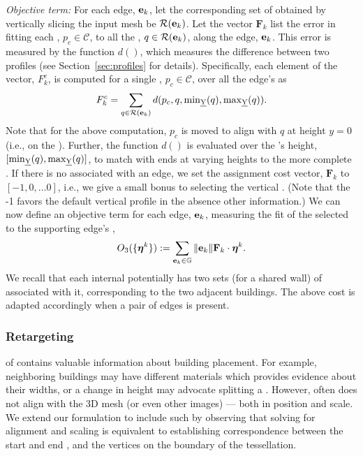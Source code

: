 {\noindent \em Objective term:}
For each edge, $\mathbf{e}_k$, let the corresponding set of \rawprofiles obtained by vertically slicing the input mesh be $\mathcal{R}(\mathbf{e}_k)$.
%
Let the vector $\mathbf{F}_k$ list the error in fitting each \cleanprofile, $p_c \in \mathcal{C}$, to all the \rawprofiles, $q \in \mathcal{R}(\mathbf{e}_k)$, along the edge, $\mathbf{e}_k$. This error is measured by the function $d()$, which measures the difference between two profiles (see Section~\ref{sec:profiles} for details). 
% 
Specifically, each element of the vector, $F^c_k$, is computed for a single \cleanprofile, $p_c \in \mathcal{C}$, over all the edge's \rawprofiles as
% 
$$
F^c_k = \sum_{q \in \mathcal{R}(\mathbf{e}_k)}{ d(p_c, q, {\min}_{\text{\emph{Y}}}(q), {\max}_{\text{\emph{Y}}}(q))}.
$$
Note that for the above computation, $p_c$ is moved to align with $q$ at height $y=0$ (i.e., on the \sweepedge). Further, the function $d()$ is evaluated over the \rawprofile's height, $[{\min}_{\text{\emph{Y}}}(q),{\max}_{\text{\emph{Y}}}(q)]$, to match \rawprofiles with ends at varying heights to the more complete \cleanprofile.
%
If there is no \rawprofile associated with an edge, we set the assignment cost vector, $\mathbf{F}_k$ to $[-1,0,\dots0]$, i.e., we give a small bonus to selecting the vertical \cleanprofile. (Note that the -1 favors the default vertical profile in the absence other information.) 
%
%
We can now define an objective term for each edge, $\mathbf{e}_k$, measuring the fit of the selected \cleanprofile to the supporting edge's \rawprofiles,
$$ O_3 ( \{ \mathbold{\eta}^k \} ) :=  \sum_{\edge_k \in \mathbb{G}}   \|\edge_k\| \mathbf{F}_k \cdot   \mathbold{\eta}^k.$$ 
%
%
We recall that each internal \sweepedge potentially has two sets (for a shared wall) of \rawprofiles associated with it, corresponding to the two adjacent buildings. The above cost is adapted accordingly when a pair of edges is present. 




\subsubsection{Retargeting \buildingfacades} 
%
\StreetI of \facades contains valuable information about building placement. For example, neighboring buildings may have different materials which provides evidence about their widths, or a change in \facade height may advocate splitting a \footprintpolygon. However, \streetI often does not align with the 3D mesh (or even other images) --- both in position and scale. We extend our formulation to include such \streetI by observing that solving for alignment and scaling is equivalent to establishing correspondence between the start and end \buildingfacadepoints, and the vertices on the boundary of the tessellation. 

